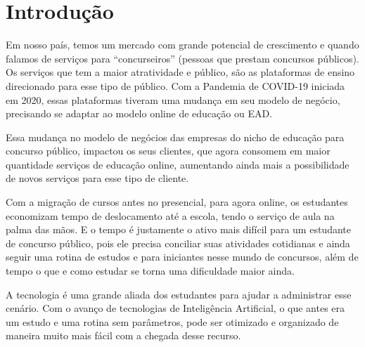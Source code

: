 \chapter{Introdução}


Em nosso país, temos um mercado com grande potencial de crescimento e quando falamos de serviços para “concurseiros” (pessoas que prestam concursos públicos). Os serviços que tem a maior atratividade e público, são as plataformas de ensino direcionado para esse tipo de público. Com a Pandemia de COVID-19 iniciada em 2020, essas plataformas tiveram uma mudança em seu modelo de negócio, precisando se adaptar ao modelo online de educação ou EAD. 

Essa mudança no modelo de negócios das empresas do nicho de educação para concurso público, impactou os seus clientes, que agora consomem em maior quantidade serviços de educação online, aumentando ainda mais a possibilidade de novos serviços para esse tipo de cliente.

Com a migração de cursos antes no presencial, para agora online, os estudantes economizam tempo de deslocamento até a escola, tendo o serviço de aula na palma das mãos. E o tempo é justamente o ativo mais difícil para um estudante de concurso público, pois ele precisa conciliar suas atividades cotidianas e ainda seguir uma rotina de estudos e para iniciantes nesse mundo de concursos, além de tempo o que e como estudar se torna uma dificuldade maior ainda.

A tecnologia é uma grande aliada dos estudantes para ajudar a administrar esse cenário. Com o avanço de tecnologias de Inteligência Artificial, o que antes era um estudo e uma rotina sem parâmetros, pode ser otimizado e organizado de maneira muito mais fácil com a chegada desse recurso.





